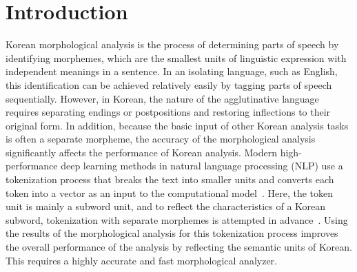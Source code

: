 \documentclass[AMS,STIX2COL]{WileyNJD-v2}
\begin{document}
    \section{Introduction}\label{sec:intro}

    Korean morphological analysis is the process of determining parts of speech by identifying morphemes, which are the smallest units of linguistic expression with independent meanings in a sentence.
    In an isolating language, such as English, this identification can be achieved relatively easily by tagging parts of speech sequentially. However, in Korean, the nature of the agglutinative language requires separating endings or postpositions and restoring inflections to their original form.
    In addition, because the basic input of other Korean analysis tasks is often a separate morpheme, the accuracy of the morphological analysis significantly affects the performance of Korean analysis.
    Modern high-performance deep learning methods in natural language processing (NLP) use a tokenization process that breaks the text into smaller units and converts each token into a vector as an input to the computational model~\cite{Mikolov2013}.
    Here, the token unit is mainly a subword unit, and to reflect the characteristics of a Korean subword, tokenization with separate morphemes is attempted in advance~\cite{SongHJ2021}.
    Using the results of the morphological analysis for this tokenization process improves the overall performance of the analysis by reflecting the semantic units of Korean. This requires a highly accurate and fast morphological analyzer.
\end{document}

